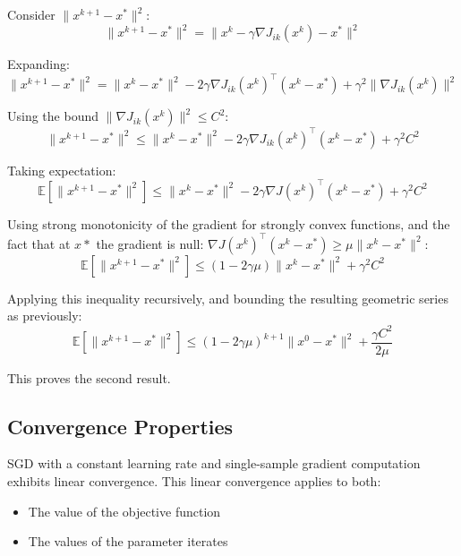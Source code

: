      Consider $\|x^{k+1} - x^*\|^2$:
    \begin{equation*}
        \|x^{k+1} - x^*\|^2 = \|x^k - \gamma\nabla J_{ik}(x^k) - x^*\|^2
    \end{equation*}

     Expanding:
    \begin{equation*}
        \|x^{k+1} - x^*\|^2 = \|x^k - x^*\|^2 - 2\gamma\nabla J_{ik}(x^k)^\top(x^k - x^*) + \gamma^2\|\nabla J_{ik}(x^k)\|^2
    \end{equation*}

     Using the bound $\|\nabla J_{ik}(x^k)\|^2 \leq C^2$:
    \begin{equation*}
        \|x^{k+1} - x^*\|^2 \leq \|x^k - x^*\|^2 - 2\gamma\nabla J_{ik}(x^k)^\top(x^k - x^*) + \gamma^2C^2
    \end{equation*}

     Taking expectation:
    \begin{equation*}
        \mathbb{E}[\|x^{k+1} - x^*\|^2] \leq \|x^k - x^*\|^2 - 2\gamma\nabla J(x^k)^\top(x^k - x^*) + \gamma^2C^2
    \end{equation*}

     Using strong monotonicity of the gradient for strongly convex functions, and the fact that at $x*$ the gradient is null: $\nabla J(x^k)^\top(x^k - x^*) \geq \mu\|x^k - x^*\|^2$:
    \begin{equation*}
        \mathbb{E}[\|x^{k+1} - x^*\|^2] \leq (1-2\gamma\mu)\|x^k - x^*\|^2 + \gamma^2C^2
    \end{equation*}

     Applying this inequality recursively, and bounding the resulting geometric series as previously:
    \begin{equation*}
        \mathbb{E}[\|x^{k+1} - x^*\|^2] \leq (1-2\gamma\mu)^{k+1}\|x^0 - x^*\|^2 + \frac{\gamma C^2}{2\mu}
    \end{equation*}

This proves the second result.

\subsection*{Convergence Properties}
SGD with a constant learning rate and single-sample gradient computation exhibits linear convergence. This linear convergence applies to both:

\begin{itemize}
    \item The value of the objective function
    \item The values of the parameter iterates
\end{itemize}

